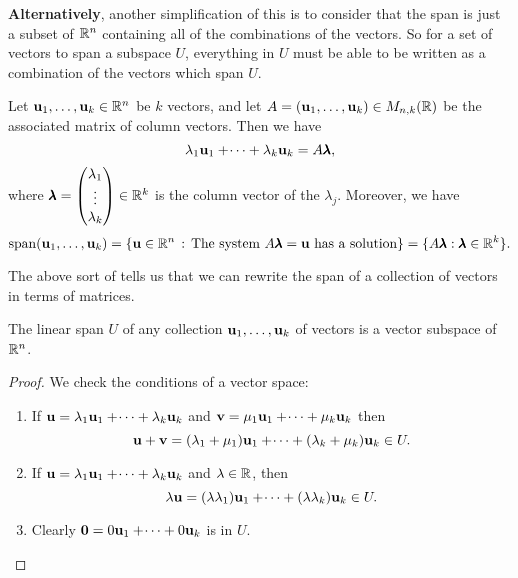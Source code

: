 \documentclass[10pt, a4paper]{article}
\begin{document}
\textbf{Alternatively},
another simplification of this is to consider that the span is just a subset of $\mathbb{R} ^ n$ containing all of the combinations of the vectors.
So for a set of vectors to span a subspace $U$,
everything in $U$ must be able to be written as a combination of the vectors which span $U$.
\medskip

\begin{proposition}\label{pre_linalg_prop_spanissolutionset}
    Let $\mathbf{u}_1, \dotsc, \mathbf{u}_k \in \mathbb{R} ^ n$ be $k$ vectors,
    and let $A = (\mathbf{u}_1, \dotsc, \mathbf{u}_k) \in M_{n, k}(\mathbb{R})$ be the associated matrix of column vectors.
    Then we have
    \[
    \lambda_1\mathbf{u}_1 + \dotsi + \lambda_k\mathbf{u}_k = A\pmb{\lambda},
    \]
    where $\pmb{\lambda} = \begin{pmatrix}
        \lambda_1 \\ \vdots \\ \lambda_k
    \end{pmatrix} \in \mathbb{R} ^ k$ is the column vector of the $\lambda_j$.
    Moreover,
    we have
    \[
    \mathrm{span}(\mathbf{u}_1, \dotsc, \mathbf{u}_k) = \{\mathbf{u} \in \mathbb{R} ^ n\,:\,\text{The system } A\pmb{\lambda} = \mathbf{u}\text{ has a solution}\} = \{A\pmb{\lambda}:\pmb{\lambda} \in \mathbb{R} ^ k\}.
    \]
\end{proposition}
The above sort of tells us that we can rewrite the span of a collection of vectors in terms of matrices.

\begin{lemma}
    The linear span $U$ of any collection $\mathbf{u}_1, \dotsc, \mathbf{u}_k$ of vectors is a vector subspace of $\mathbb{R} ^ n$.
    \begin{proof}
        We check the conditions of a vector space:
        \begin{enumerate}[label = (\roman*)]
            \item If $\mathbf{u} = \lambda_1\mathbf{u}_1 + \dotsi + \lambda_k\mathbf{u}_k$ and $\mathbf{v} = \mu_1\mathbf{u}_1 + \dotsi + \mu_k\mathbf{u}_k$ then
            \[
            \mathbf{u} + \mathbf{v} = (\lambda_1 + \mu_1)\mathbf{u}_1 + \dotsi + (\lambda_k + \mu_k)\mathbf{u}_k \in U.
            \]
            \item If $\mathbf{u} = \lambda_1\mathbf{u}_1 + \dotsi + \lambda_k\mathbf{u}_k$ and $\lambda \in \mathbb{R}$,
            then
            \[
            \lambda\mathbf{u} = (\lambda\lambda_1)\mathbf{u}_1 + \dotsi + (\lambda\lambda_k)\mathbf{u}_k \in U.
            \]
            \item Clearly $\mathbf{0} = 0\mathbf{u}_1 + \dotsi + 0\mathbf{u}_k$ is in $U$.
        \end{enumerate}
    \end{proof}
\end{lemma}
\end{document}
